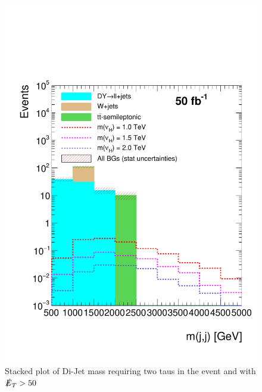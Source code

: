 \begin{figure}[htbp!]
\centering
\includegraphics[width=0.9\linewidth]{StackPlots/mjj_2taus_met50_50ifb.pdf}
\caption{Stacked plot of Di-Jet mass requiring two taus in the event and with $\slashed{E}_{T} > 50$}
\label{fig: mjj2tausMet50}
\end{figure}

